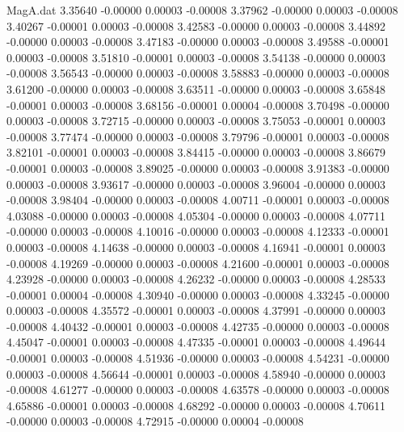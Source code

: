 \begin{filecontents}{MagA.dat}
   3.35640   -0.00000    0.00003   -0.00008
   3.37962   -0.00000    0.00003   -0.00008
   3.40267   -0.00001    0.00003   -0.00008
   3.42583   -0.00000    0.00003   -0.00008
   3.44892   -0.00000    0.00003   -0.00008
   3.47183   -0.00000    0.00003   -0.00008
   3.49588   -0.00001    0.00003   -0.00008
   3.51810   -0.00001    0.00003   -0.00008
   3.54138   -0.00000    0.00003   -0.00008
   3.56543   -0.00000    0.00003   -0.00008
   3.58883   -0.00000    0.00003   -0.00008
   3.61200   -0.00000    0.00003   -0.00008
   3.63511   -0.00000    0.00003   -0.00008
   3.65848   -0.00001    0.00003   -0.00008
   3.68156   -0.00001    0.00004   -0.00008
   3.70498   -0.00000    0.00003   -0.00008
   3.72715   -0.00000    0.00003   -0.00008
   3.75053   -0.00001    0.00003   -0.00008
   3.77474   -0.00000    0.00003   -0.00008
   3.79796   -0.00001    0.00003   -0.00008
   3.82101   -0.00001    0.00003   -0.00008
   3.84415   -0.00000    0.00003   -0.00008
   3.86679   -0.00001    0.00003   -0.00008
   3.89025   -0.00000    0.00003   -0.00008
   3.91383   -0.00000    0.00003   -0.00008
   3.93617   -0.00000    0.00003   -0.00008
   3.96004   -0.00000    0.00003   -0.00008
   3.98404   -0.00000    0.00003   -0.00008
   4.00711   -0.00001    0.00003   -0.00008
   4.03088   -0.00000    0.00003   -0.00008
   4.05304   -0.00000    0.00003   -0.00008
   4.07711   -0.00000    0.00003   -0.00008
   4.10016   -0.00000    0.00003   -0.00008
   4.12333   -0.00001    0.00003   -0.00008
   4.14638   -0.00000    0.00003   -0.00008
   4.16941   -0.00001    0.00003   -0.00008
   4.19269   -0.00000    0.00003   -0.00008
   4.21600   -0.00001    0.00003   -0.00008
   4.23928   -0.00000    0.00003   -0.00008
   4.26232   -0.00000    0.00003   -0.00008
   4.28533   -0.00001    0.00004   -0.00008
   4.30940   -0.00000    0.00003   -0.00008
   4.33245   -0.00000    0.00003   -0.00008
   4.35572   -0.00001    0.00003   -0.00008
   4.37991   -0.00000    0.00003   -0.00008
   4.40432   -0.00001    0.00003   -0.00008
   4.42735   -0.00000    0.00003   -0.00008
   4.45047   -0.00001    0.00003   -0.00008
   4.47335   -0.00001    0.00003   -0.00008
   4.49644   -0.00001    0.00003   -0.00008
   4.51936   -0.00000    0.00003   -0.00008
   4.54231   -0.00000    0.00003   -0.00008
   4.56644   -0.00001    0.00003   -0.00008
   4.58940   -0.00000    0.00003   -0.00008
   4.61277   -0.00000    0.00003   -0.00008
   4.63578   -0.00000    0.00003   -0.00008
   4.65886   -0.00001    0.00003   -0.00008
   4.68292   -0.00000    0.00003   -0.00008
   4.70611   -0.00000    0.00003   -0.00008
   4.72915   -0.00000    0.00004   -0.00008

\end{filecontents}
